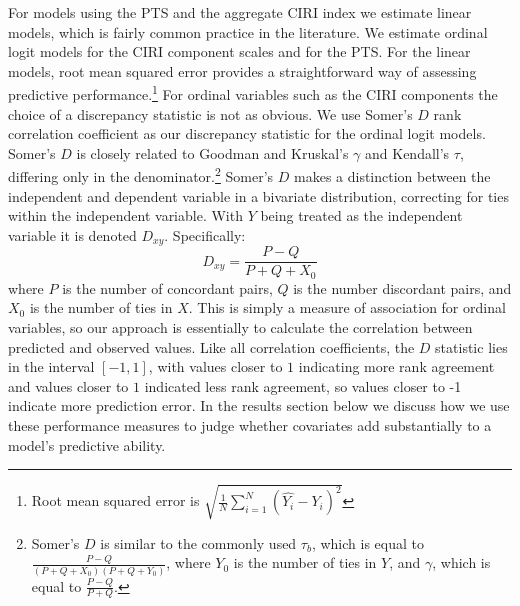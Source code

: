 \documentclass[12pt]{article}
\begin{document}
For models using the PTS and the aggregate CIRI index we estimate linear models, which is fairly common practice in the literature. We estimate ordinal logit models for the CIRI component scales and for the PTS. For the linear models, root mean squared error provides a straightforward way of assessing predictive performance.\footnote{Root mean squared error is $\displaystyle \sqrt{\frac{1}{N} \sum\limits_{i=1}^N (\hat{Y_{i}} - Y_{i})^2} $} For ordinal variables such as the CIRI components the choice of a discrepancy statistic is not as obvious. We use Somer's $D$ rank correlation coefficient  \citep{Somers1962} as our discrepancy statistic for the ordinal logit models.
Somer's $D$ is closely related to Goodman and Kruskal's $\gamma$ and Kendall's $\tau$, differing only in the denominator.\footnote{Somer's $D$ is similar to the commonly used $\tau_b$, which is equal to $\frac{P - Q}{(P+Q+X_0)(P+Q+Y_0)}$, where $Y_0$ is the number of ties in $Y$, and $\gamma$, which is equal to $\frac{P - Q}{P + Q}$.} Somer's $D$ makes a distinction between the independent and dependent variable in a bivariate distribution, correcting for ties within the independent variable. With $Y$ being treated as the independent variable it is denoted $D_{xy}$. 
Specifically:
$$D_{xy} = \frac{P - Q}{P + Q + X_0}$$
\noindent where $P$ is the number of concordant pairs, $Q$ is the number discordant pairs, and $X_0$ is the number of ties in $X$. This is simply a measure of association for ordinal variables, so our approach is essentially to calculate the correlation between predicted and observed values. Like all correlation coefficients, the $D$ statistic lies in the interval $[-1, 1]$, with values closer to $1$ indicating more rank agreement and values closer to $1$ indicated less rank agreement, so values closer to -1 indicate more prediction error. In the results section below we discuss how we use these performance measures to judge whether covariates add substantially to a model's predictive ability. 
\end{document}
